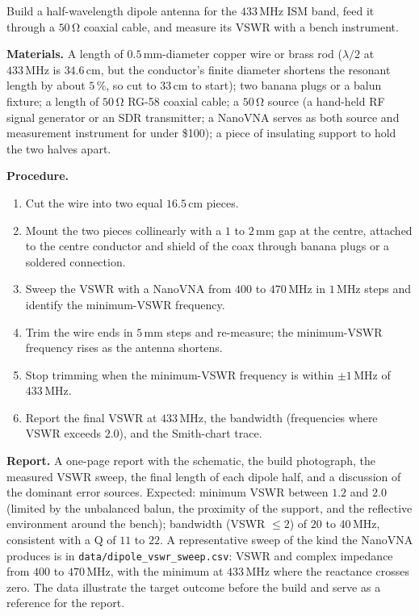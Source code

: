 \begin{project}
Build a half-wavelength dipole antenna for the $433\,\si{\mega\hertz}$
ISM band, feed it through a $50\,\si{\ohm}$ coaxial cable, and measure
its VSWR with a bench instrument.

\textbf{Materials.}
A length of $0.5\,\si{\milli\meter}$-diameter copper wire or brass
rod ($\lambda/2$ at $433\,\si{\mega\hertz}$ is $34.6\,\si{\centi
\meter}$, but the conductor's finite diameter shortens the resonant
length by about $5\,\%$, so cut to $33\,\si{\centi\meter}$ to start);
two banana plugs or a balun fixture; a length of $50\,\si{\ohm}$
RG-58 coaxial cable; a $50\,\si{\ohm}$ source (a hand-held RF signal
generator or an SDR transmitter; a NanoVNA serves as both source and
measurement instrument for under \$100); a piece of insulating support
to hold the two halves apart.

\textbf{Procedure.}
\begin{enumerate}
  \item Cut the wire into two equal $16.5\,\si{\centi\meter}$ pieces.
  \item Mount the two pieces collinearly with a $1$ to $2\,\si{\milli
    \meter}$ gap at the centre, attached to the centre conductor and
    shield of the coax through banana plugs or a soldered connection.
  \item Sweep the VSWR with a NanoVNA from $400$ to $470\,\si{\mega
    \hertz}$ in $1\,\si{\mega\hertz}$ steps and identify the
    minimum-VSWR frequency.
  \item Trim the wire ends in $5\,\si{\milli\meter}$ steps and
    re-measure; the minimum-VSWR frequency rises as the antenna
    shortens.
  \item Stop trimming when the minimum-VSWR frequency is within
    $\pm 1\,\si{\mega\hertz}$ of $433\,\si{\mega\hertz}$.
  \item Report the final VSWR at $433\,\si{\mega\hertz}$, the bandwidth
    (frequencies where VSWR exceeds $2.0$), and the Smith-chart trace.
\end{enumerate}

\textbf{Report.} A one-page report with the schematic, the build
photograph, the measured VSWR sweep, the final length of each dipole
half, and a discussion of the dominant error sources. Expected:
minimum VSWR between $1.2$ and $2.0$ (limited by the unbalanced
balun, the proximity of the support, and the reflective environment
around the bench); bandwidth (VSWR $\le 2$) of $20$ to $40\,\si{\mega
\hertz}$, consistent with a Q of $11$ to $22$. A representative sweep of the kind
the NanoVNA produces is in \texttt{data/dipole\_vswr\_sweep.csv}: VSWR
and complex impedance from $400$ to $470\,\si{\mega\hertz}$, with the
minimum at $433\,\si{\mega\hertz}$ where the reactance crosses zero. The
data illustrate the target outcome before the build and serve as a
reference for the report.
\end{project}

